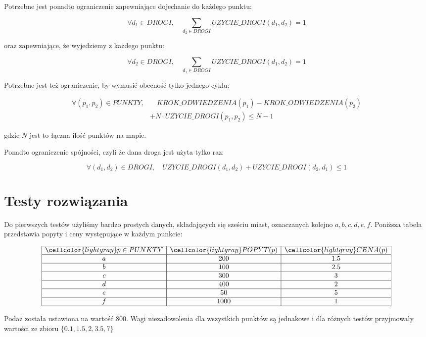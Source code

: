 \documentclass[]{article}
\begin{document}
Potrzebne jest ponadto ograniczenie zapewniające dojechanie do każdego punktu:

\[
	\forall d_1 \in DROGI, \quad \sum_{d_2 \in DROGI} UZYCIE\_DROGI(d_1, d_2) = 1
\]

oraz zapewniające, że wyjedziemy z każdego punktu:

\[
	\forall d_2 \in DROGI, \quad \sum_{d_1 \in DROGI} UZYCIE\_DROGI(d_1, d_2) = 1
\]

Potrzebne jest też ograniczenie, by wymusić obecność tylko jednego cyklu:

\begin{align}
\forall (p_1, p_2) \in PUNKTY, &\quad KROK\_ODWIEDZENIA(p_1) - KROK\_ODWIEDZENIA(p_2) \nonumber \\&+ N \cdot UZYCIE\_DROGI(p_1, p_2) \leq N - 1 \nonumber
\end{align}

gdzie $N$ jest to łączna ilość punktów na mapie.

Ponadto ograniczenie spójności, czyli że dana droga jest użyta tylko raz:

\[
\forall (d_1, d_2) \in DROGI, \quad UZYCIE\_DROGI(d_1, d_2) + UZYCIE\_DROGI(d_2, d_1) \leq 1
\]

\section{Testy rozwiązania}

Do pierwszych testów użyliśmy bardzo prostych danych, składających się sześciu miast, oznaczanych kolejno $a,b,c,d,e,f$. Poniższa tabela przedstawia popyty i ceny występujące w każdym punkcie:

\[
\begin{array}{|c|c|c|}
	\hline
	\cellcolor{lightgray} p \in PUNKTY & \cellcolor{lightgray} POPYT(p) & \cellcolor{lightgray} CENA(p) \\ 
	\hline
	a & 200 & 1.5 \\ 
	\hline
	b & 100 & 2.5 \\ 
	\hline
	c & 300 & 3 \\ 
	\hline
	d & 400 & 2 \\ 
	\hline
	e & 50 & 5 \\ 
	\hline
	f & 1000 & 1 \\
	\hline
\end{array} 
\]

Podaż została ustawiona na wartość 800. Wagi niezadowolenia dla wszystkich punktów są jednakowe i dla różnych testów przyjmowały wartości ze zbioru $\{0.1, 1.5, 2, 3.5, 7\}$
\end{document}
